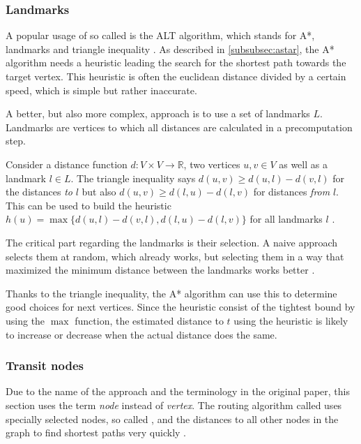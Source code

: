 		\subsubsection{Landmarks}
		
			A popular usage of so called  is the ALT algorithm, which stands for A*, landmarks and triangle inequality \cite{goldberg-landmarks}.
			As described in \cref{subsubsec:astar}, the A* algorithm needs a heuristic leading the search for the shortest path towards the target vertex.
			This heuristic is often the euclidean distance divided by a certain speed, which is simple but rather inaccurate.
			
			A better, but also more complex, approach is to use a set of landmarks $L$.
			Landmarks are vertices to which all distances are calculated in a precomputation step.
			
			Consider a distance function $d : V \times V \rightarrow \mathbb{R}$, two vertices $u, v \in V$ as well as a landmark $l \in L$.
			The triangle inequality says $d(u,v) \geq d(u,l) - d(v,l)$ for the distances \emph{to} $l$ but also $d(u,v) \geq d(l,u) - d(l,v)$ for distances \emph{from} $l$.
			This can be used to build the heuristic $h(u) = \max \{ d(u,l)-d(v,l), d(l,u)-d(l,v) \}$ for all landmarks $l$ \cite[6-7]{goldberg-landmarks}.
			
			The critical part regarding the landmarks is their selection.
			A naive approach selects them at random, which already works, but selecting them in a way that maximized the minimum distance between the landmarks works better \cite[7]{goldberg-landmarks}.
			
			Thanks to the triangle inequality, the A* algorithm can use this to determine good choices for next vertices.
			Since the heuristic consist of the tightest bound by using the $\max$ function, the estimated distance to $t$ using the heuristic is likely to increase or decrease when the actual distance does the same.
		
		\subsubsection{Transit nodes}
		\label{subsubsec:transit}
		
			Due to the name of the approach and the terminology in the original paper, this section uses the term \emph{node} instead of \emph{vertex}.
			The routing algorithm called  uses specially selected nodes, so called , and the distances to all other nodes in the graph to find shortest paths very quickly \cite{bast-transit}.
		
